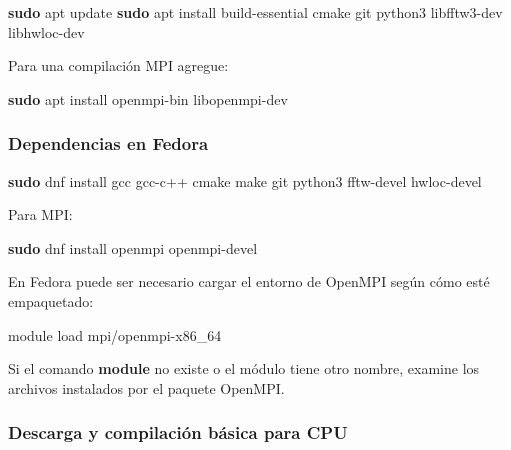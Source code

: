 \documentclass[
  spanish,
  11pt,
  a4paper]{article}
\newenvironment{Shaded}{\begin{snugshade}}{\end{snugshade}}
\newcommand{\ExtensionTok}[1]{#1}
\newcommand{\FunctionTok}[1]{\textcolor[rgb]{0.13,0.29,0.53}{\textbf{#1}}}
\newcommand{\NormalTok}[1]{#1}
\begin{document}
\begin{Shaded}
\begin{Highlighting}[]
\FunctionTok{sudo}\NormalTok{ apt update}
\FunctionTok{sudo}\NormalTok{ apt install build{-}essential cmake git python3     libfftw3{-}dev libhwloc{-}dev}
\end{Highlighting}
\end{Shaded}

Para una compilación MPI agregue:

\begin{Shaded}
\begin{Highlighting}[]
\FunctionTok{sudo}\NormalTok{ apt install openmpi{-}bin libopenmpi{-}dev}
\end{Highlighting}
\end{Shaded}

\subsubsection{Dependencias en Fedora}\label{dependencias-en-fedora}

\begin{Shaded}
\begin{Highlighting}[]
\FunctionTok{sudo}\NormalTok{ dnf install gcc gcc{-}c++ cmake make git python3     fftw{-}devel hwloc{-}devel}
\end{Highlighting}
\end{Shaded}

Para MPI:

\begin{Shaded}
\begin{Highlighting}[]
\FunctionTok{sudo}\NormalTok{ dnf install openmpi openmpi{-}devel}
\end{Highlighting}
\end{Shaded}

En Fedora puede ser necesario cargar el entorno de OpenMPI según cómo
esté empaquetado:

\begin{Shaded}
\begin{Highlighting}[]
\ExtensionTok{module}\NormalTok{ load mpi/openmpi{-}x86\_64}
\end{Highlighting}
\end{Shaded}

Si el comando \textbf{module} no existe o el módulo tiene otro nombre,
examine los archivos instalados por el paquete OpenMPI.

\subsubsection{Descarga y compilación básica para
CPU}\label{descarga-y-compilaciuxf3n-buxe1sica-para-cpu}
\end{document}
